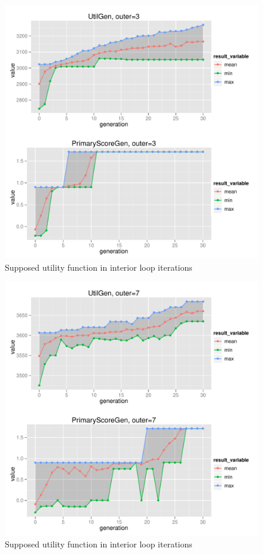 \begin{figure}
  \centering \includegraphics[width=1.0\textwidth]{exp/nouncert/c2_utilgen_03}
  \caption{Supposed utility function in interior loop iterations}
  \label{c2_utilgen_03}
\end{figure}

\begin{figure}
  \centering \includegraphics[width=1.0\textwidth]{exp/nouncert/c2_utilgen_07}
  \caption{Supposed utility function in interior loop iterations}
  \label{c2_utilgen_07}
\end{figure}

